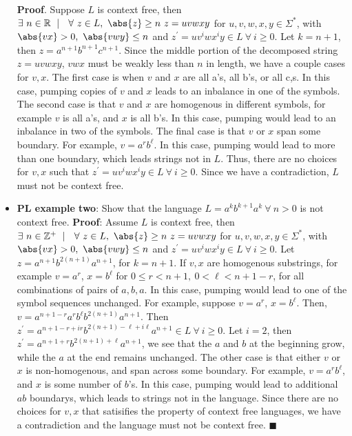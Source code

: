 \documentclass{report}
\begin{document}
\begin{itemize}
                \bigbreak \noindent 
                \textbf{Proof}. Suppose $L$ is context free, then $\exists \ n \in \mathbb{R}\  \mid \ \ \forall \ z \in L,\ \abs{z} \geq n \ z = uvwxy$ for $u,v,w,x,y \in \Sigma^{*}$, with $\abs{vx} > 0,\ \abs{vwy} \leq n$ and $z^{\prime} = uv^{i}wx^{i}y \in L \ \forall \ i \geq 0$.
                \bigbreak \noindent 
                Let $k=n+1$, then $z= a^{n+1}b^{n+1}c^{n+1}$. Since the middle portion of the decomposed string $z=uvwxy$, $vwx$ must be weakly less than $n$ in length, we have a couple cases for $v,x$. The first case is when $v$ and $x$ are all a's, all b's, or all c,s. In this case, pumping copies of $v$ and $x$ leads to an inbalance in one of the symbols. The second case is that $v$ and $x$ are homogenous in different symbols, for example $v$ is all a's, and $x$ is all b's. In this case, pumping would lead to an inbalance in two of the symbols. The final case is that $v$ or $x$  span some boundary. For example, $v = a^{r}b^{\ell}$. In this case, pumping would lead to more than one boundary, which leads strings not in $L$. Thus, there are no choices for $v,x$ such that $z^{\prime} = uv^{i}wx^{i}y \in L \ \forall \ i \geq 0$. Since we have a contradiction, $L$ must not be context free.
                \bigbreak \noindent 
            \item \textbf{PL example two}: Show that the language $L = a^{k}b^{k+1}a^{k} \ \forall \ n>0$ is not context free.
                \bigbreak \noindent 
                \textbf{Proof}: Assume $L$ is context free, then $\exists \ n \in \mathbb{Z}^+\  \mid \ \ \forall \ z \in L,\ \abs{z} \geq n \ z = uvwxy$ for $u,v,w,x,y \in \Sigma^{*}$, with $\abs{vx} > 0,\ \abs{vwy} \leq n$ and $z^{\prime} = uv^{i}wx^{i}y \in L \ \forall \ i \geq 0$.
                \bigbreak \noindent 
                Let $z = a^{n+1}b^{2(n+1)}a^{n+1}$, for $k=n+1$. If $v,x$ are homogenous substrings, for example $v=a^{r}$, $x=b^{\ell}$ for $ 0 \leq r < n +1, \ 0 < \ell < n+1 - r$, for all combinations of pairs of $a,b,a$. In this case, pumping would lead to one of the symbol sequences unchanged. For example, suppose $v=a^{r}$, $x=b^{\ell}$. Then, $v = a^{n+1-r}a^{r}b^{\ell}b^{2(n+1)}a^{n+1}$. Then  $z^{\prime} = a^{n+1-r+ir}b^{2(n+1)-\ell + i\ell} a^{n+1} \in L \ \forall \ i \geq 0 $. Let $i=2$, then $z^{\prime} = a^{n+1+r}b^{2(n+1)+\ell}a^{n+1}$, we see that the $a$ and $b$ at the beginning grow, while the $a$ at the end remains unchanged.
                \bigbreak \noindent 
                The other case is that either $v$ or $x$ is non-homogenous, and span across some boundary. For example, $v=a^{r}b^{\ell}$, and $x$ is some number of $b$'s. In this case, pumping would lead to additional $ab$ boundarys, which leads to strings not in the language. Since there are no choices for $v,x$ that satisifies the property of context free languages, we have a contradiction and the language must not be context free. $\blacksquare$

\end{itemize}
\end{document}
